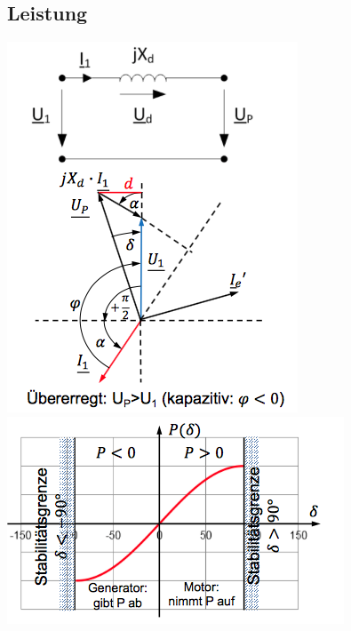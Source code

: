 \subsection{Leistung}
\begin{minipage}{0.25 \linewidth}
\includegraphics[width =  \linewidth]{./Pics/VL1011/Leistung}\\
\includegraphics[width =  \linewidth]{./Pics/VL1011/Leistung2}
\end{minipage}
